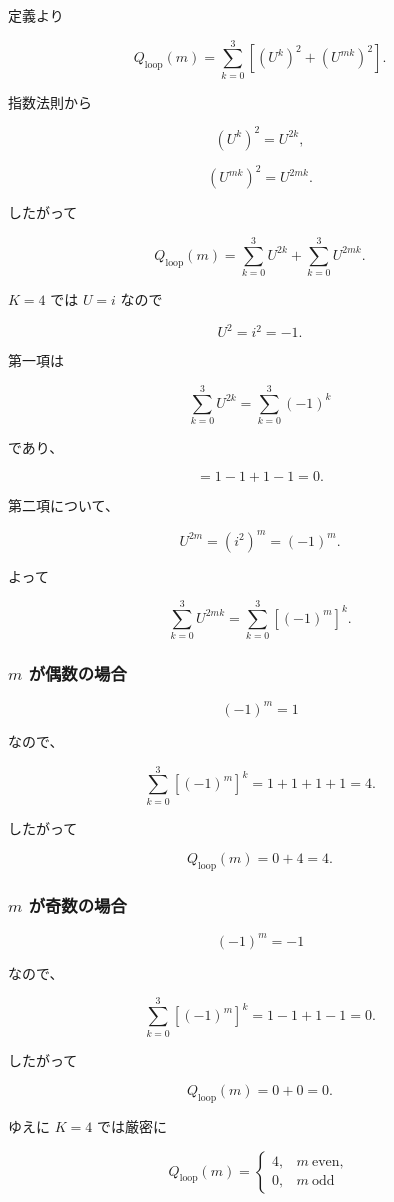 \documentclass[
  a4paper,
]{ltjsarticle}
\begin{document}
定義より

\[
Q_{\mathrm{loop}}(m)
=
\sum_{k=0}^{3}
\left[(U^k)^2+(U^{mk})^2\right].
\]

指数法則から

\[
(U^k)^2
=
U^{2k},
\]

\[
(U^{mk})^2
=
U^{2mk}.
\]

したがって

\[
Q_{\mathrm{loop}}(m)
=
\sum_{k=0}^{3}U^{2k}
+
\sum_{k=0}^{3}U^{2mk}.
\]

\(K=4\) では \(U=i\) なので

\[
U^2=i^2=-1.
\]

第一項は

\[
\sum_{k=0}^{3}U^{2k}
=
\sum_{k=0}^{3}(-1)^k
\]

であり、

\[
=1-1+1-1
=0.
\]

第二項について、

\[
U^{2m}
=(i^2)^m
=(-1)^m.
\]

よって

\[
\sum_{k=0}^{3}U^{2mk}
=
\sum_{k=0}^{3}\left[(-1)^m\right]^k.
\]

\subsubsection{\texorpdfstring{\(m\)
が偶数の場合}{m が偶数の場合}}\label{m-ux304cux5076ux6570ux306eux5834ux5408}

\[
(-1)^m=1
\]

なので、

\[
\sum_{k=0}^{3}\left[(-1)^m\right]^k
=
1+1+1+1
=4.
\]

したがって

\[
Q_{\mathrm{loop}}(m)
=0+4
=4.
\]

\subsubsection{\texorpdfstring{\(m\)
が奇数の場合}{m が奇数の場合}}\label{m-ux304cux5947ux6570ux306eux5834ux5408}

\[
(-1)^m=-1
\]

なので、

\[
\sum_{k=0}^{3}\left[(-1)^m\right]^k
=
1-1+1-1
=0.
\]

したがって

\[
Q_{\mathrm{loop}}(m)
=0+0
=0.
\]

ゆえに \(K=4\) では厳密に

\[
\boxed{
Q_{\mathrm{loop}}(m)
=
\begin{cases}
4,&m\ \mathrm{even},\\
0,&m\ \mathrm{odd}
\end{cases}
}
\]
\end{document}

